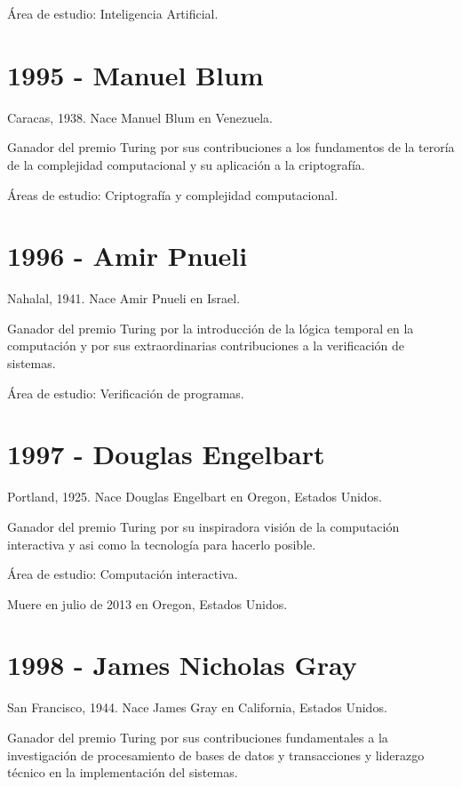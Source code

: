 \documentclass[notitlepage,letterpaper, 11pt]{article}
\begin{document}
\noindent Área de estudio: Inteligencia Artificial.
\newpage

\section*{1995 - Manuel Blum}
\noindent Caracas, 1938. Nace Manuel Blum en Venezuela.

\noindent Ganador del premio Turing por sus contribuciones a los fundamentos de la teroría de la complejidad computacional y su aplicación a la criptografía.

\noindent Áreas de estudio: Criptografía y complejidad computacional.
\newline

\section*{1996 - Amir Pnueli}
\noindent Nahalal, 1941. Nace Amir Pnueli en Israel.

\noindent Ganador del premio Turing por la introducción de la lógica temporal en la computación y por sus extraordinarias contribuciones a la verificación de sistemas.

\noindent Área de estudio: Verificación de programas. 
\newline

\section*{1997 - Douglas Engelbart}
\noindent Portland, 1925. Nace Douglas Engelbart en Oregon, Estados Unidos.

\noindent Ganador del premio Turing por su inspiradora visión de la computación interactiva y asi como la tecnología para hacerlo posible.

\noindent Área de estudio: Computación interactiva. 

\noindent Muere en julio de 2013 en Oregon, Estados Unidos.
\newline


\section*{1998 - James Nicholas Gray}
\noindent San Francisco, 1944. Nace James Gray en California, Estados Unidos.

\noindent Ganador del premio Turing por sus contribuciones fundamentales a la investigación de procesamiento de bases de datos y transacciones y liderazgo técnico en la implementación del sistemas.
\end{document}
